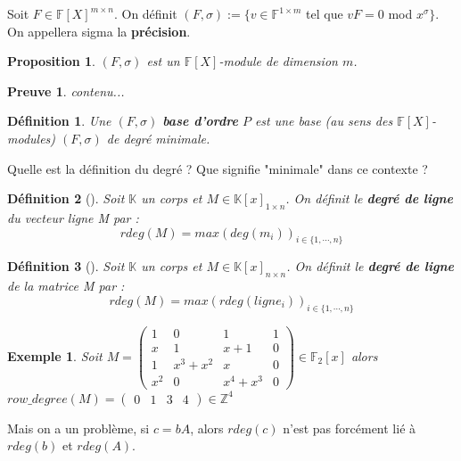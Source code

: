 \documentclass[a4paper,12pt]{report}  %
\theoremstyle{definitionstyle}
\newtheorem{definition}{Définition}[chapter] %
\theoremstyle{examplestyle}
\newtheorem{example}{Exemple}[chapter] %
\theoremstyle{remarkstyle}
\theoremstyle{propositionstyle}
\newtheorem{proposition}{Proposition}[chapter]  %
\theoremstyle{theoremstyle}
\theoremstyle{proofstyle}
\newtheorem{preuve}{Preuve}[chapter]  %
\begin{document}
	Soit $F \in \mathbb{F}[X]^{m \times n}$. On définit $(F, \sigma):= \{v \in \mathbb{F}^{1 \times m}$ tel que $ vF = 0$ mod $x^\sigma\}$. On appellera sigma la \textbf{précision}.
	
	\begin{proposition}
		$(F, \sigma)$ est un $\mathbb{F}[X]$-module de dimension $m$.
	\end{proposition}

	\begin{preuve}
		contenu...
	\end{preuve}

\begin{definition}
	Une $(F, \sigma)$ \textbf{base d'ordre} $P$ est une base (au sens des $\mathbb{F}[X]$-modules) $(F, \sigma)$ de degré minimale.
\end{definition}
	
Quelle est la définition du degré ? Que signifie "minimale" dans ce contexte ?

\begin{definition}[\cite{CCLebreton}]
	Soit $\mathbb{K}$ un corps et $M \in \mathbb{K}[x]_{1 \times n}$. On définit le \textbf{degré de ligne} du vecteur ligne M par : 
	$$rdeg(M)=max(deg(m_i))_{i\in\{1, \cdots, n\}}$$
\end{definition}
	
	\begin{definition}[\cite{CCLebreton}]
		Soit $\mathbb{K}$ un corps et $M \in \mathbb{K}[x]_{n \times n}$. On définit le \textbf{degré de ligne} de la matrice M par :
		$$rdeg(M)=max(rdeg(ligne_i))_{i\in\{1, \cdots, n\}}$$
	\end{definition}
	
	\begin{example}
		Soit $M =
		\left(\begin{array}{rrrr}
			1 & 0 & 1 & 1 \\
			x & 1 & x + 1 & 0 \\
			1 & x^{3} + x^{2} & x & 0 \\
			x^{2} & 0 & x^{4} + x^{3} & 0
		\end{array}\right) \in \mathbb{F}_2[x]
		$
		alors $row\_degree(M)=\left(\begin{array}{rrrr}
			0 & 1 & 3 & 4
		\end{array}\right)\in \mathbb{Z}^4$
		
	\end{example}
	
	Mais on a un problème, si $c = bA$, alors $rdeg(c)$ n'est pas forcément lié à $rdeg(b)$ et $rdeg(A)$.
	
\end{document}
